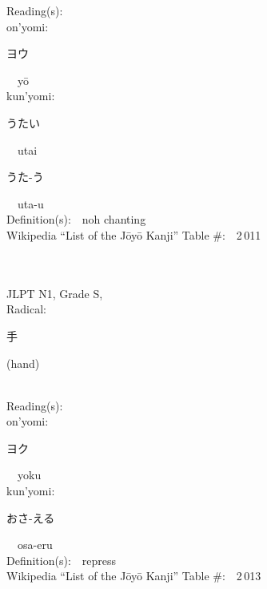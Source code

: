 \begin{multicols}{2}
Reading(s):\ \ \\
{\hspace*{1em}}on'yomi:\ \ \\
{\hspace*{2em}}{\begin{CJK}{UTF8}{min} ヨウ \end{CJK}}\ \ y\=o\ \ \\
{\hspace*{1em}}kun'yomi:\ \ \\
{\hspace*{2em}}{\begin{CJK}{UTF8}{min} うたい \end{CJK}}\ \ utai\ \ \\
{\hspace*{2em}}{\begin{CJK}{UTF8}{min} うた-う \end{CJK}}\ \ uta-u\ \ \\
Definition(s):\ \ noh chanting \\
Wikipedia ``List of the J\=oy\=o Kanji'' Table \#:\ \ 2\,011 \\
\ \ \\
{\fontsize{34pt}{40pt}  }\ \ \\
{JLPT N1, Grade S, \\Radical:\ \ {\begin{CJK}{UTF8}{min} 手 \end{CJK}} (hand) } \\
Reading(s):\ \ \\
{\hspace*{1em}}on'yomi:\ \ \\
{\hspace*{2em}}{\begin{CJK}{UTF8}{min} ヨク \end{CJK}}\ \ yoku\ \ \\
{\hspace*{1em}}kun'yomi:\ \ \\
{\hspace*{2em}}{\begin{CJK}{UTF8}{min} おさ-える \end{CJK}}\ \ osa-eru\ \ \\
Definition(s):\ \ repress \\
Wikipedia ``List of the J\=oy\=o Kanji'' Table \#:\ \ 2\,013 \\
\ \ \\

\end{multicols}
